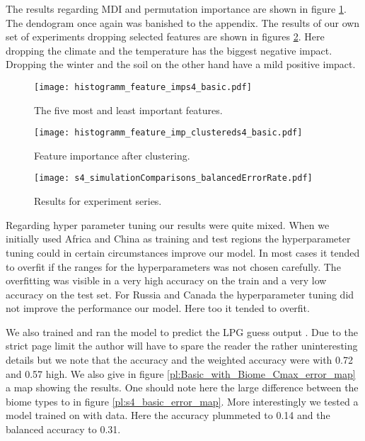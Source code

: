 The results regarding MDI and permutation importance are shown in figure \ref{pl:histogramm_feature_imps4_basic}.
The dendogram once again was banished to the appendix.
The results of our own set of experiments dropping selected features are shown in figures \ref{pl:s4_simulationComparisons_balancedErrorRate}.
Here dropping the climate and the temperature has the biggest negative impact.
Dropping the winter and the soil on the other hand have a mild positive impact.
\begin{figure}[h]
  \centering
  \texttt{[image: histogramm\_feature\_imps4\_basic.pdf]}
  \caption{The five most and least important features.}
  \label{pl:histogramm_feature_imps4_basic}
\end{figure}
\begin{figure}[h]
  \centering
  \begin{minipage}{0.45\textwidth}
    \centering
    \texttt{[image: histogramm\_feature\_imp\_clustereds4\_basic.pdf]}
    \caption{Feature importance after clustering.}
    \label{pl:histogramm_feature_imp_clustereds4_basic}
  \end{minipage}
  \hfill
  \begin{minipage}{0.45\textwidth}
    \centering
    \texttt{[image: s4\_simulationComparisons\_balancedErrorRate.pdf]}
    \caption{Results for experiment series.}
    \label{pl:s4_simulationComparisons_balancedErrorRate}
  \end{minipage}
\end{figure}

Regarding hyper parameter tuning our results were quite mixed.
When we initially used Africa and China as training and test regions the hyperparameter tuning could
in certain circumstances improve our model. In most cases it tended to overfit if the ranges for the hyperparameters
was not chosen carefully. The overfitting was visible in a very high accuracy on the train and a very low accuracy
on the test set.
For Russia and Canada the hyperparameter tuning did not improve the performance our model. 
Here too it tended to overfit.

We also trained and ran the model to predict the LPG guess output . Due to the strict page limit
the author will have to spare the reader the rather uninteresting details but we note that the accuracy and the 
weighted accuracy were with 0.72 and 0.57 high. We also give in figure \ref{pl:Basic_with_Biome_Cmax_error_map}
a map showing the results. One should note here the large difference between the biome types
to  in figure \ref{pl:s4_basic_error_map}. 
More interestingly we tested a model trained on  with  data. Here the accuracy
plummeted to 0.14 and the balanced accuracy to 0.31.

